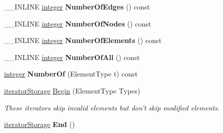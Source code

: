 \begin{DoxyCompactItemize}
\item 
\hypertarget{classINMOST_1_1Mesh_a404c19f0ddf24cd968de766cf130b371}{\-\_\-\-\_\-\-I\-N\-L\-I\-N\-E \hyperlink{classINMOST_1_1Storage_aec96942bc647417a801e2895b45964d2}{integer} {\bfseries Number\-Of\-Edges} () const }\label{classINMOST_1_1Mesh_a404c19f0ddf24cd968de766cf130b371}

\item 
\hypertarget{classINMOST_1_1Mesh_a4562c5fd5341705ed706b3c4cfda80fe}{\-\_\-\-\_\-\-I\-N\-L\-I\-N\-E \hyperlink{classINMOST_1_1Storage_aec96942bc647417a801e2895b45964d2}{integer} {\bfseries Number\-Of\-Nodes} () const }\label{classINMOST_1_1Mesh_a4562c5fd5341705ed706b3c4cfda80fe}

\item 
\hypertarget{classINMOST_1_1Mesh_a7aee6d7f5b7432dc34bc7319a9e1e8f4}{\-\_\-\-\_\-\-I\-N\-L\-I\-N\-E \hyperlink{classINMOST_1_1Storage_aec96942bc647417a801e2895b45964d2}{integer} {\bfseries Number\-Of\-Elements} () const }\label{classINMOST_1_1Mesh_a7aee6d7f5b7432dc34bc7319a9e1e8f4}

\item 
\hypertarget{classINMOST_1_1Mesh_a8f8e4c3631d8448e738f26cfc99e6871}{\-\_\-\-\_\-\-I\-N\-L\-I\-N\-E \hyperlink{classINMOST_1_1Storage_aec96942bc647417a801e2895b45964d2}{integer} {\bfseries Number\-Of\-All} () const }\label{classINMOST_1_1Mesh_a8f8e4c3631d8448e738f26cfc99e6871}

\item 
\hypertarget{classINMOST_1_1Mesh_a51c44999830564f5abfbc6920dbe4a1b}{\hyperlink{classINMOST_1_1Storage_aec96942bc647417a801e2895b45964d2}{integer} {\bfseries Number\-Of} (Element\-Type t) const }\label{classINMOST_1_1Mesh_a51c44999830564f5abfbc6920dbe4a1b}

\item 
\hypertarget{classINMOST_1_1Mesh_aaee057ff8894f5920556eea758f45a05}{\hyperlink{classINMOST_1_1Mesh_1_1base__iterator}{iterator\-Storage} \hyperlink{classINMOST_1_1Mesh_aaee057ff8894f5920556eea758f45a05}{Begin} (Element\-Type Types)}\label{classINMOST_1_1Mesh_aaee057ff8894f5920556eea758f45a05}

\begin{DoxyCompactList}\small\item\em These iterators skip invalid elements but don't skip modified elements. \end{DoxyCompactList}\item 
\hypertarget{classINMOST_1_1Mesh_ab4075ba5683113b9da966ee8254c9c98}{\hyperlink{classINMOST_1_1Mesh_1_1base__iterator}{iterator\-Storage} {\bfseries End} ()}\label{classINMOST_1_1Mesh_ab4075ba5683113b9da966ee8254c9c98}


\end{DoxyCompactItemize}
